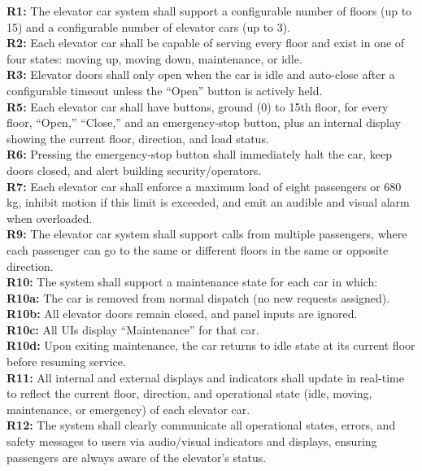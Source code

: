 \textbf{R1:} The elevator car system shall support a configurable number of floors (up to 15) and a configurable number of elevator cars (up to 3).
\\
\textbf{R2:} Each elevator car shall be capable of serving every floor and exist in one of four states: moving up, moving down, maintenance, or idle.
\\
\textbf{R3:} Elevator doors shall only open when the car is idle and auto-close after a configurable timeout unless the ``Open'' button is actively held.
\\
\textbf{R5:} Each elevator car shall have buttons, ground (0) to 15th floor, for every floor, ``Open,'' ``Close,'' and an emergency-stop button, plus an internal display showing the current floor, direction, and load status.
\\
\textbf{R6:} Pressing the emergency-stop button shall immediately halt the car, keep doors closed, and alert building security/operators.
\\
\textbf{R7:} Each elevator car shall enforce a maximum load of eight passengers or 680 kg, inhibit motion if this limit is exceeded, and emit an audible and visual alarm when overloaded.
\\
\textbf{R9:} The elevator car system shall support calls from multiple passengers, where each passenger can go to the same or different floors in the same or opposite direction.
\\
\textbf{R10:} The system shall support a maintenance state for each car in which:
\\
\textbf{R10a:} The car is removed from normal dispatch (no new requests assigned).
\\
\textbf{R10b:} All elevator doors remain closed, and panel inputs are ignored.
\\
\textbf{R10c:} All UIs display ``Maintenance'' for that car.
\\
\textbf{R10d:} Upon exiting maintenance, the car returns to idle state at its current floor before resuming service.
\\
\textbf{R11:} All internal and external displays and indicators shall update in real-time to reflect the current floor, direction, and operational state (idle, moving, maintenance, or emergency) of each elevator car.
\\
\textbf{R12:} The system shall clearly communicate all operational states, errors, and safety messages to users via audio/visual indicators and displays, ensuring passengers are always aware of the elevator's status.


